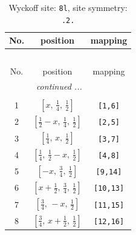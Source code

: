 \documentclass[fleqn,8pt]{jsarticle}
\begin{document}
\begin{longtable}{ccc}
\caption{Wyckoff site: {\tt 8l}, site symmetry: {\tt .2.}}
 \\
 \hline \hline
No. & position & mapping \\ \hline \endfirsthead

\multicolumn{2}{l}{\tablename\ \thetable{}} \\
 \hline \hline
No. & position & mapping \\ \hline \endhead

 \hline \hline
\multicolumn{2}{r}{\footnotesize\it continued ...} \\ \endfoot

 \hline \hline
\multicolumn{2}{r}{} \\ \endlastfoot

1 & $\left[ x,\, \frac{1}{4},\, \frac{1}{2} \right]$ & {\tt [1,6]} \\ \hline
2 & $\left[ \frac{1}{2} - x,\, \frac{1}{4},\, \frac{1}{2} \right]$ & {\tt [2,5]} \\ \hline
3 & $\left[ \frac{1}{4},\, x,\, \frac{1}{2} \right]$ & {\tt [3,7]} \\ \hline
4 & $\left[ \frac{1}{4},\, \frac{1}{2} - x,\, \frac{1}{2} \right]$ & {\tt [4,8]} \\ \hline
5 & $\left[ - x,\, \frac{3}{4},\, \frac{1}{2} \right]$ & {\tt [9,14]} \\ \hline
6 & $\left[ x + \frac{1}{2},\, \frac{3}{4},\, \frac{1}{2} \right]$ & {\tt [10,13]} \\ \hline
7 & $\left[ \frac{3}{4},\, - x,\, \frac{1}{2} \right]$ & {\tt [11,15]} \\ \hline
8 & $\left[ \frac{3}{4},\, x + \frac{1}{2},\, \frac{1}{2} \right]$ & {\tt [12,16]} \\
\end{longtable}
\renewcommand{\arraystretch}{1.2}
\end{document}
